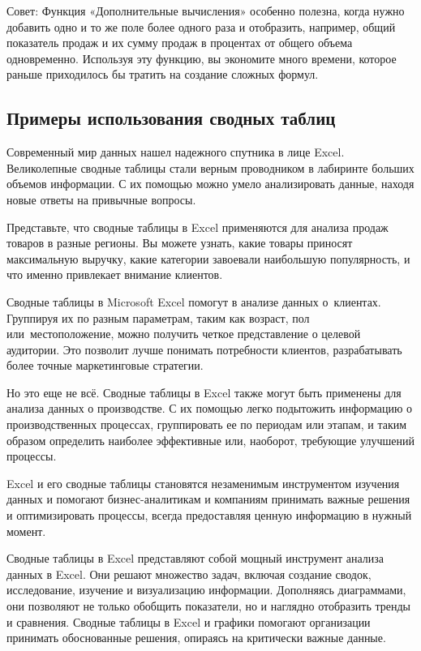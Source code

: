 \documentclass{ou}
\begin{document}
Совет: Функция «Дополнительные вычисления» особенно полезна, когда нужно добавить одно и то же поле более одного раза и отобразить, например, общий показатель продаж и их сумму продаж в процентах от общего объема одновременно. Используя эту функцию, вы экономите много времени, которое раньше приходилось бы тратить на создание сложных формул.

\subsection{Примеры использования сводных таблиц}
Современный мир данных нашел надежного спутника в лице Excel. Великолепные сводные таблицы стали верным проводником в лабиринте больших объемов информации. С их помощью можно умело анализировать данные, находя новые ответы на привычные вопросы.

Представьте, что сводные таблицы в Excel применяются для анализа продаж товаров в разные регионы. Вы можете узнать, какие товары приносят максимальную выручку, какие категории завоевали наибольшую популярность, и что именно привлекает внимание клиентов.

Сводные таблицы в Microsoft Excel помогут в анализе данных о~клиентах. Группируя их по разным параметрам, таким как возраст, пол или~местоположение, можно получить четкое представление о целевой аудитории. Это позволит лучше понимать потребности клиентов, разрабатывать более точные маркетинговые стратегии.

Но это еще не всё. Сводные таблицы в Excel также могут быть применены для анализа данных о производстве. С их помощью легко подытожить информацию о производственных процессах, группировать ее по периодам или этапам, и таким образом определить наиболее эффективные или, наоборот, требующие улучшений процессы.

Excel и его сводные таблицы становятся незаменимым инструментом изучения данных и помогают бизнес-аналитикам и компаниям принимать важные решения и оптимизировать процессы, всегда предоставляя ценную информацию в нужный момент.

Сводные таблицы в Excel представляют собой мощный инструмент анализа данных в Excel. Они решают множество задач, включая создание сводок, исследование, изучение и визуализацию информации. Дополняясь диаграммами, они позволяют не только обобщить показатели, но и наглядно отобразить тренды и сравнения. Сводные таблицы в Excel и графики помогают организации принимать обоснованные решения, опираясь на критически важные данные.
\end{document}

